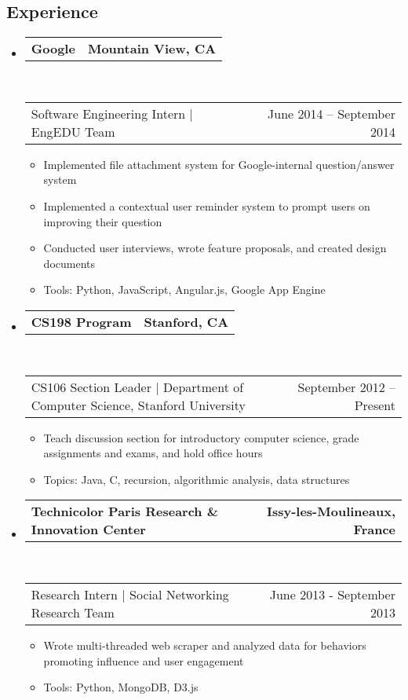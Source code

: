 \documentclass[10pt,letterpaper]{article}
\makeatletter
\newcommand{\topheaderrow}[2]
{\begin{tabular*}{\linewidth}{l@{\extracolsep{\fill}}r}
    \textbf{#1} &
    \textbf{#2}
    \vspace{0.2ex}
\end{tabular*}}
\newcommand{\botheaderrow}[2]
{\begin{tabular*}{\linewidth}{l@{\extracolsep{\fill}}r}
    #1 &
    #2 \\
\end{tabular*}}
\newcommand{\CPP}
{C\nolinebreak[4]\hspace{-.05em}\raisebox{.22ex}{\footnotesize\bf ++}}
\makeatother
\begin{document}
\subsection*{Experience}
\begin{itemize}

    \item
    \topheaderrow
        {\textbf{Google}}
        {\textbf{Mountain View, CA}}
    \\
    \botheaderrow
        {Software Engineering Intern | EngEDU Team}
        {June 2014 -- September 2014}
        \vspace{-5mm}
    \begin{itemize}[label={-}, labelsep=5pt]
        \item Implemented file attachment system for Google-internal question/answer system
        \item Implemented a contextual user reminder system to prompt users on improving their question
        \item Conducted user interviews, wrote feature proposals, and created design documents
        \item Tools: Python, JavaScript, Angular.js, Google App Engine
    \end{itemize}
    
    \item
    \topheaderrow
        {\textbf{CS198 Program}}
        {\textbf{Stanford, CA}}
    \\
    \botheaderrow
        {CS106 Section Leader | Department of Computer Science, Stanford University}
        {September 2012 -- Present}
    \begin{itemize}[label={-}, labelsep=5pt]
        \item Teach discussion section for introductory computer science, grade assignments and
              exams, and hold office hours
        \item Topics: Java, \CPP, recursion, algorithmic analysis, data structures
    \end{itemize}

    \item
    \topheaderrow
        {\textbf{Technicolor Paris Research \& Innovation Center}}
        {\textbf{Issy-les-Moulineaux, France}}
    \\
    \botheaderrow
        {Research Intern | Social Networking Research Team}
        {June 2013 - September 2013}
    \begin{itemize}[label={-}, labelsep=5pt]
        \item Wrote multi-threaded web scraper and analyzed data for behaviors promoting influence and user engagement
        \item Tools: Python, MongoDB, D3.js
    \end{itemize}


\end{itemize}
\end{document}
